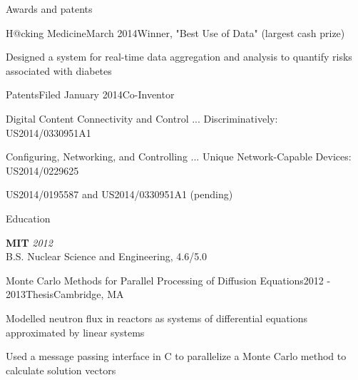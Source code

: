 \documentclass{resume}
\begin{document}
\begin{rSection}{Awards and patents}

\begin{rSubsection}{H@cking Medicine}{March 2014}{Winner, "Best Use of Data" (largest cash prize)}{}
\item Designed a system for real-time data aggregation and analysis to quantify risks associated with diabetes
\end{rSubsection}



\begin{rSubsection}{Patents}{Filed January 2014}{Co-Inventor}{}
\item Digital Content Connectivity and Control ... Discriminatively: US2014/0330951A1
\item Configuring, Networking, and Controlling ... Unique Network-Capable Devices: US2014/0229625
\item US2014/0195587 and US2014/0330951A1 (pending)
\end{rSubsection}
\end{rSection}

\begin{rSection}{Education}

{\bf MIT} \hfill {\em 2012} \\ 
B.S. Nuclear Science and Engineering, 4.6/5.0


\begin{rSubsection}{Monte Carlo Methods for Parallel Processing of Diffusion Equations}{2012 - 2013}{Thesis}{Cambridge, MA}
\item Modelled neutron flux in reactors as systems of differential equations approximated by linear systems
\item Used a message passing interface in C to parallelize a Monte Carlo method to calculate solution vectors
\end{rSubsection}

\end{rSection}
\end{document}
